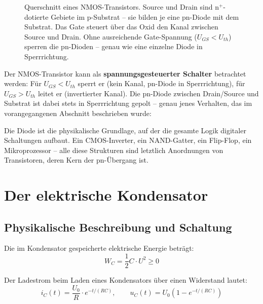 ﻿\documentclass[12pt, a4paper]{article}
\begin{document}
\begin{figure}[h]
		\caption{Querschnitt eines NMOS-Transistors. Source und Drain sind
			n$^+$-dotierte Gebiete im p-Substrat -- sie bilden je eine pn-Diode mit dem
			Substrat. Das Gate steuert über das Oxid den Kanal zwischen Source und Drain.
			Ohne ausreichende Gate-Spannung ($U_{GS} < U_{th}$) sperren die pn-Dioden --
			genau wie eine einzelne Diode in Sperrrichtung.}
		\label{fig:nmos_querschnitt}
	\end{figure}
	
	Der NMOS-Transistor kann als \textbf{spannungsgesteuerter Schalter} betrachtet
	werden: Für $U_{GS} < U_{th}$ sperrt er (kein Kanal, pn-Diode in Sperrrichtung),
	für $U_{GS} > U_{th}$ leitet er (invertierter Kanal). Die pn-Diode zwischen
	Drain/Source und Substrat ist dabei stets in Sperrrichtung gepolt -- genau
	jenes Verhalten, das im vorangegangenen Abschnitt beschrieben wurde:
	
	Die Diode ist die physikalische Grundlage, auf der die gesamte Logik
	digitaler Schaltungen aufbaut. Ein CMOS-Inverter, ein NAND-Gatter, ein
	Flip-Flop, ein Mikroprozessor -- alle diese Strukturen sind letztlich
	Anordnungen von Transistoren, deren Kern der pn-Übergang ist.
	
	\section{Der elektrische Kondensator}
	
	\subsection{Physikalische Beschreibung und Schaltung}
	
	Die im Kondensator gespeicherte elektrische Energie beträgt:
	\begin{equation}
		W_C = \frac{1}{2} C \cdot U^2 \geq 0
		\label{eq:kondensator_energie}
	\end{equation}
	
	Der Ladestrom beim Laden eines Kondensators über einen Widerstand lautet:
	\begin{equation}
		i_C(t) = \frac{U_0}{R} \cdot e^{-t/(RC)}, \qquad
		u_C(t) = U_0 \left(1 - e^{-t/(RC)}\right)
	\end{equation}
	
\end{document}
